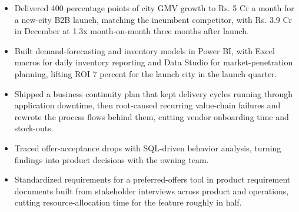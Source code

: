 \documentclass[letterpaper,10pt]{article}
\begin{document}
\begin{itemize}
\item Delivered 400 percentage points of city GMV growth to Rs. 5 Cr a month for a new-city B2B launch, matching the incumbent competitor, with Rs. 3.9 Cr in December at 1.3x month-on-month three months after launch.
\item Built demand-forecasting and inventory models in Power BI, with Excel macros for daily inventory reporting and Data Studio for market-penetration planning, lifting ROI 7 percent for the launch city in the launch quarter.
\item Shipped a business continuity plan that kept delivery cycles running through application downtime, then root-caused recurring value-chain failures and rewrote the process flows behind them, cutting vendor onboarding time and stock-outs.
\end{itemize}

\begin{itemize}
\item Traced offer-acceptance drops with SQL-driven behavior analysis, turning findings into product decisions with the owning team.
\item Standardized requirements for a preferred-offers tool in product requirement documents built from stakeholder interviews across product and operations, cutting resource-allocation time for the feature roughly in half.
\end{itemize}
\end{document}
